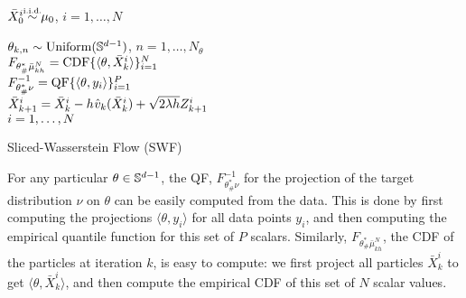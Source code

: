      \begin{algorithm2e} %
		 \SetInd{0.1ex}{1.5ex}
		 \DontPrintSemicolon
		 {\color{purple} \small {}}
		 $\bar{X}_0^i \simiid \mu_0$, \hfill $i = 1,\dots,N$ \\
     {
		    {\color{purple} \small {}}
		    $\theta_{k,n} \sim \mathrm{Uniform}(\mathbb{S}^{d-1})$, \hfill $n = 1,\dots,N_\theta$\\
        {
        {\color{purple} \small {}}
        $F_{\theta^*_\#\bar{\mu}_{kh}^{N}}=\textnormal{CDF}\{\langle\theta,\bar{X}_k^i \rangle\}_{i=1}^N$\\
        {\color{purple} \small {}}
        $F^{-1}_{\theta^*_\#\nu}=\textnormal{QF}\{\langle\theta,y_i \rangle\}_{i=1}^P$\\
        }
        {\color{purple} \small {}}
        $\bar{X}_{k+1}^i = \bar{X}_{k}^i - h \hspace{0.5pt} \hat{v}_k(\bar{X}^i_k) + \sqrt{2 \lambda h} Z^i_{k+1}$ \vspace{2pt} \\
        $\hfill i = 1,\dots,N$

		 }
		 \caption{Sliced-Wasserstein Flow (SWF)}
		 \label{algo:flow}
	 \end{algorithm2e}

For any particular $\theta\in\mathbb{S}^{d-1}$, the QF, $F_{\theta^*_\#\nu}^{-1}$ for the projection of the target distribution $\nu$ on $\theta$ can be easily computed from the data. This is done by first computing the projections $\langle \theta, y_i\rangle$ for all data points $y_i$, and then computing the empirical quantile function for this set of $P$ scalars.
%
Similarly, $F_{\theta^*_\#\bar{\mu}_{kh}^{N}}$, the CDF of the particles at iteration $k$, is easy to compute: we first project all particles $\bar{X}_k^i$ to get $\langle \theta, \bar{X}_k^i\rangle$, and then compute the empirical CDF of this set of $N$ scalar values.

